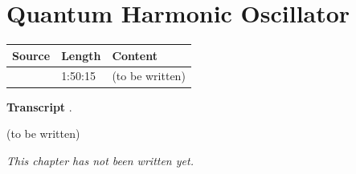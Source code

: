 \chapter{Quantum Harmonic Oscillator}\label{ch:c36}
\begin{paracol}{2}

\begin{sources}
\begin{tabularx}{\linewidth}{@{}l l L@{}}
\toprule
\textbf{Source} & \textbf{Length} & \textbf{Content}\\
\midrule
{} & 1:50:15 & (to be written)\\
\bottomrule
\end{tabularx}

\smallskip
\textbf{Transcript} .
\end{sources}

\begin{reading}
(to be written)
\end{reading}

\emph{This chapter has not been written yet.}

\flushside
\end{paracol}

